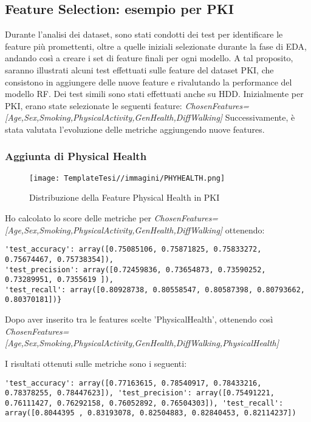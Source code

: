 \subsection{Feature Selection: esempio per PKI \label{selezionesetfinali}}
\begin{flushleft}
Durante l'analisi dei dataset, sono stati condotti dei test per identificare le feature più promettenti, oltre a quelle iniziali selezionate durante la fase di EDA, andando così a creare i set di feature finali per ogni modello. A tal proposito, saranno illustrati alcuni test effettuati sulle feature del dataset PKI, che consistono in aggiungere delle nuove feature e rivalutando la performance del modello RF. Dei test simili sono stati effettuati anche su HDD. 
\newline
Inizialmente per PKI, erano state selezionate le seguenti feature:
\emph{ChosenFeatures=[Age,Sex,Smoking,PhysicalActivity,GenHealth,DiffWalking]}
\newline
Successivamente, è stata valutata l'evoluzione delle metriche aggiungendo nuove features.
\subsubsection{Aggiunta di Physical Health}

\begin{figure}[H]
    \centering
    \texttt{[image: TemplateTesi//immagini/PHYHEALTH.png]}
    \caption{Distribuzione della Feature Physical Health in PKI}
    \label{fig:PHPKIDistr}
\end{figure}
Ho calcolato lo score delle metriche per 
\newline
\emph{ChosenFeatures=[Age,Sex,Smoking,PhysicalActivity,GenHealth,DiffWalking]}
\newline
ottenendo:
\begin{lstlisting}
'test_accuracy': array([0.75085106, 0.75871825, 0.75833272, 0.75674467, 0.75738354]), 
'test_precision': array([0.72459836, 0.73654873, 0.73590252, 0.73289951, 0.7355619 ]), 
'test_recall': array([0.80928738, 0.80558547, 0.80587398, 0.80793662, 0.80370181])}
\end{lstlisting}
Dopo aver inserito tra le features scelte 'PhysicalHealth', ottenendo così 
\newline
\emph{ChosenFeatures=[Age,Sex,Smoking,PhysicalActivity,GenHealth,DiffWalking,PhysicalHealth]}

I risultati ottenuti sulle metriche sono i seguenti:

\begin{lstlisting}
'test_accuracy': array([0.77163615, 0.78540917, 0.78433216, 0.78378255, 0.78447623]), 'test_precision': array([0.75491221, 0.76111427, 0.76292158, 0.76052892, 0.76504303]), 'test_recall': array([0.8044395 , 0.83193078, 0.82504883, 0.82840453, 0.82114237])
\end{lstlisting}


\end{flushleft}
